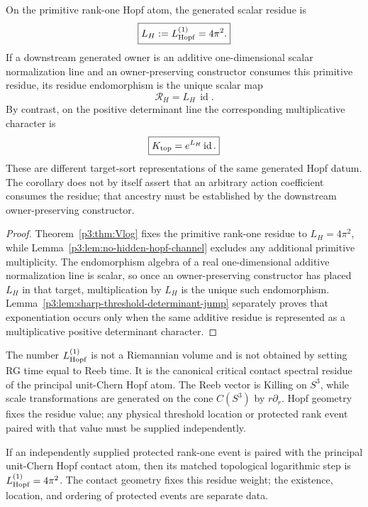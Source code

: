 \documentclass[12pt,a4paper]{article}
\begin{document}
\begin{corollary}
\label{p3:cor:v2122-hopf-residue-target-typing}
On the primitive rank-one Hopf atom, the generated scalar residue is
\[
 \boxed{L_H:=L_{\mathrm{Hopf}}^{(1)}=4\pi^2.}
\]
If a downstream generated owner is an additive one-dimensional scalar
normalization line and an owner-preserving constructor consumes this primitive
residue, its residue endomorphism is the unique scalar map
\[
 \boxed{\mathscr R_H=L_H\,\operatorname{id}.}
\]
By contrast, on the positive determinant line the corresponding multiplicative
character is
\[
 \boxed{K_{\rm top}=e^{L_H}\operatorname{id}.}
\]
These are different target-sort representations of the same generated Hopf
datum.  The corollary does not by itself assert that an arbitrary action
coefficient consumes the residue; that ancestry must be established by the
downstream owner-preserving constructor.
\end{corollary}

\begin{proof}
Theorem~\ref{p3:thm:Vlog} fixes the primitive rank-one residue to
\(L_H=4\pi^2\), while Lemma~\ref{p3:lem:no-hidden-hopf-channel} excludes any
additional primitive multiplicity.  The endomorphism algebra of a real
one-dimensional additive normalization line is scalar, so once an
owner-preserving constructor has placed \(L_H\) in that target, multiplication
by \(L_H\) is the unique such endomorphism.  Lemma~\ref{p3:lem:sharp-threshold-determinant-jump}
separately proves that exponentiation occurs only when the same additive
residue is represented as a multiplicative positive determinant character.
\end{proof}

\begin{remark}
The number \(L_{\mathrm{Hopf}}^{(1)}\) is not a Riemannian volume and is not obtained by
setting RG time equal to Reeb time.  It is the canonical critical contact
spectral residue of the principal unit-Chern Hopf atom.  The Reeb vector is Killing on
\(S^3\), while scale transformations are generated on the cone \(C(S^3)\)
by \(r\partial_r\).  Hopf geometry fixes the residue value; any physical
threshold location or protected rank event paired with that value must be
supplied independently.
\end{remark}

\begin{corollary}
\label{p3:cor:completed-primitive-rg-jump}
If an independently supplied protected rank-one event is paired with the
principal unit-Chern Hopf contact atom, then its matched topological logarithmic step is
\(L_{\mathrm{Hopf}}^{(1)}=4\pi^2\).  The contact geometry fixes this residue weight; the
existence, location, and ordering of protected events are separate data.
\end{corollary}
\end{document}
